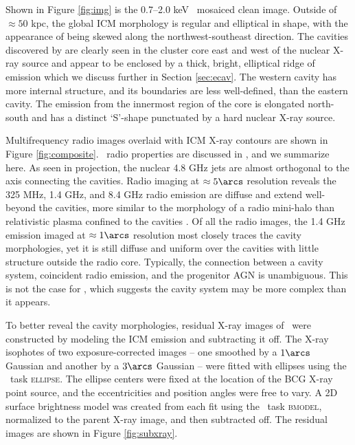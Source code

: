 \documentclass[11pt, preprint]{aastex}
\begin{document}
Shown in Figure \ref{fig:img} is the 0.7--2.0 keV \cxo\ mosaiced clean
image. Outside of $\approx 50$ kpc, the global ICM morphology is
regular and elliptical in shape, with the appearance of being skewed
along the northwest-southeast direction. The cavities discovered by
\citet{schindler01} are clearly seen in the cluster core east and west
of the nuclear X-ray source and appear to be enclosed by a thick,
bright, elliptical ridge of emission which we discuss further in
Section \ref{sec:ecav}. The western cavity has more internal
structure, and its boundaries are less well-defined, than the eastern
cavity. The emission from the innermost region of the core is
elongated north-south and has a distinct `S'-shape punctuated by a
hard nuclear X-ray source.

Multifrequency radio images overlaid with ICM X-ray contours are shown
in Figure \ref{fig:composite}. \rbs\ radio properties are discussed in
\citet{gitti06}, and we summarize here. As seen in projection, the
nuclear 4.8 GHz jets are almost orthogonal to the axis connecting the
cavities. Radio imaging at $\approx 5\arcs$ resolution reveals the 325
MHz, 1.4 GHz, and 8.4 GHz radio emission are diffuse and extend
well-beyond the cavities, more similar to the morphology of a radio
mini-halo than relativistic plasma confined to the cavities
\citep[][Doria et al., in preparation]{2008A&A...486L..31C}. Of all
the radio images, the 1.4 GHz emission imaged at $\approx 1 \arcs$
resolution most closely traces the cavity morphologies, yet it is
still diffuse and uniform over the cavities with little structure
outside the radio core. Typically, the connection between a cavity
system, coincident radio emission, and the progenitor AGN is
unambiguous. This is not the case for \rbs, which suggests the cavity
system may be more complex than it appears.

To better reveal the cavity morphologies, residual X-ray images of
\rbs\ were constructed by modeling the ICM emission and subtracting it
off. The X-ray isophotes of two exposure-corrected images -- one
smoothed by a $1\arcs$ Gaussian and another by a $3\arcs$ Gaussian --
were fitted with ellipses using the \iraf\ task \textsc{ellipse}. The
ellipse centers were fixed at the location of the BCG X-ray point
source, and the eccentricities and position angles were free to
vary. A 2D surface brightness model was created from each fit using
the \iraf\ task \textsc{bmodel}, normalized to the parent X-ray image,
and then subtracted off. The residual images are shown in Figure
\ref{fig:subxray}.
\end{document}

